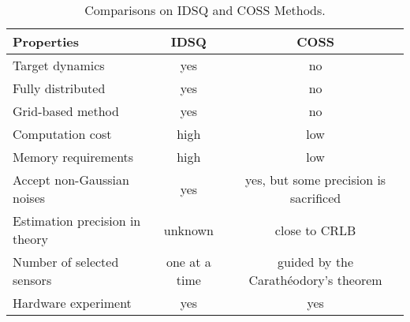 

\begin{table}
\caption{Comparisons on IDSQ and COSS Methods.}\label{t:comp}
\begin{tabular}{| l ||c|c|}
  \hline
  {\bf Properties} & {\bf IDSQ} & {\bf COSS }\\
  \hline\hline
  Target dynamics & yes & no \\
  Fully distributed & yes & no \\
  Grid-based method & yes & no \\
  Computation cost & high & low \\
  Memory requirements & high & low \\
  Accept non-Gaussian noises & yes & yes, but some precision is sacrificed \\
  Estimation precision in theory & unknown & close to CRLB \\
  Number of selected sensors & one at a time & guided by the Carath\'{e}odory's theorem \\
  Hardware experiment & yes & yes \\
  \hline
\end{tabular}
\end{table}




